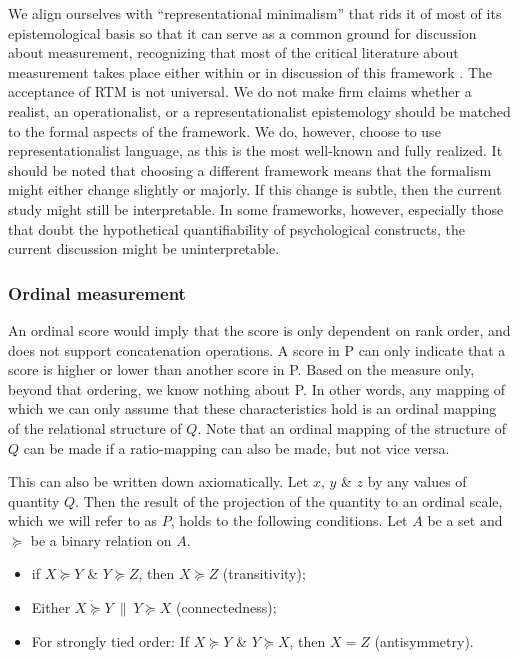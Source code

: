 \documentclass[utf8]{FrontiersinVancouver}
\begin{document}
We align ourselves with ``representational minimalism'' that rids it of most of its epistemological basis so that it can serve as a common ground for discussion about measurement, recognizing that most of the critical literature about measurement takes place either within or in discussion of this framework \citep{vessonenRepresentationMeasurement2021}. The acceptance of RTM is not universal. We do not make firm claims whether a realist, an operationalist, or a representationalist epistemology should be matched to the formal aspects of the framework. We do, however, choose to use representationalist language, as this is the most well-known and fully realized. It should be noted that choosing a different framework means that the formalism might either change slightly or majorly. If this change is subtle, then the current study might still be interpretable. In some frameworks, however, especially those that doubt the hypothetical quantifiability of psychological constructs, the current discussion might be uninterpretable. 

\subsubsection{Ordinal measurement}
An ordinal score would imply that the score is only dependent on rank order, and does not support concatenation operations. A score in P can only indicate that a score is higher or lower than another score in P. Based on the measure only, beyond that ordering, we know nothing about P. In other words, any mapping of which we can only assume that these characteristics hold is an ordinal mapping of the relational structure of $Q$. Note that an ordinal mapping of the structure of $Q$ can be made if a ratio-mapping can also be made, but not vice versa. 

This can also be written down axiomatically. Let $x$, $y$ \& $z$ by any values of quantity $Q$. Then the result of the projection of the quantity to an ordinal scale, which we will refer to as $P$, holds to the following conditions. Let $A$ be a set and $\succeq$ be a binary relation on $A$. 

\begin{itemize}
    \item if $X \succeq Y$ \& $Y \succeq Z$, then $X \succeq Z$ (transitivity);
    \item Either $X \succeq Y\ \|\ Y \succeq X$ (connectedness);
    \item For strongly tied order: If $X \succeq Y$ \& $Y \succeq X$, then $X = Z$ (antisymmetry).
\end{itemize}
\end{document}
